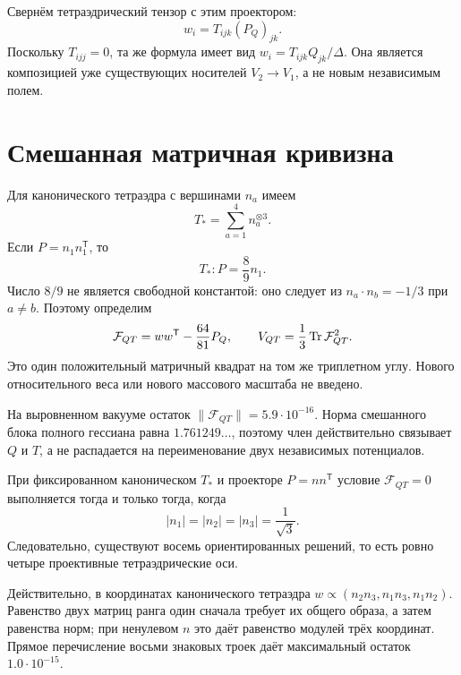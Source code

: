 Свернём тетраэдрический тензор с этим проектором:
\begin{equation}
 w_i=T_{ijk}(P_Q)_{jk}.
 \label{eq:v6-coupled-composed-arrow}
\end{equation}
Поскольку $T_{ijj}=0$, та же формула имеет вид
$w_i=T_{ijk}Q_{jk}/\Delta$. Она является композицией уже существующих
носителей $V_2\to V_1$, а не новым независимым полем.

\section{Смешанная матричная кривизна}

Для канонического тетраэдра с вершинами $n_a$ имеем
\begin{equation}
 T_*=\sum_{a=1}^{4}n_a^{\otimes3}.
\end{equation}
Если $P=n_1n_1^{\mathsf T}$, то
\begin{equation}
 T_*:P=\frac89n_1.
 \label{eq:v6-tetrahedral-projector-contraction}
\end{equation}
Число $8/9$ не является свободной константой: оно следует из
$n_a\cdot n_b=-1/3$ при $a\ne b$. Поэтому определим
\begin{equation}
 \mathcal F_{QT}
 =ww^{\mathsf T}-\frac{64}{81}P_Q,
 \qquad
 V_{QT}=\frac13\operatorname{Tr}\mathcal F_{QT}^2.
 \label{eq:v6-coupled-mixed-curvature}
\end{equation}
Это один положительный матричный квадрат на том же триплетном углу.
Нового относительного веса или нового массового масштаба не введено.

На выровненном вакууме остаток
$\|\mathcal F_{QT}\|=5.9\cdot10^{-16}$. Норма смешанного блока полного
гессиана равна $1.761249\ldots$, поэтому член действительно связывает
$Q$ и $T$, а не распадается на переименование двух независимых
потенциалов.

\begin{proposition}
При фиксированном каноническом $T_*$ и проекторе $P=nn^{\mathsf T}$
условие $\mathcal F_{QT}=0$ выполняется тогда и только тогда, когда
\begin{equation}
 |n_1|=|n_2|=|n_3|=\frac1{\sqrt3}.
\end{equation}
Следовательно, существуют восемь ориентированных решений, то есть ровно
четыре проективные тетраэдрические оси.
\end{proposition}

Действительно, в координатах канонического тетраэдра
$w\propto(n_2n_3,n_1n_3,n_1n_2)$. Равенство двух матриц ранга один
сначала требует их общего образа, а затем равенства норм; при ненулевом
$n$ это даёт равенство модулей трёх координат. Прямое перечисление восьми
знаковых троек даёт максимальный остаток $1.0\cdot10^{-15}$.

